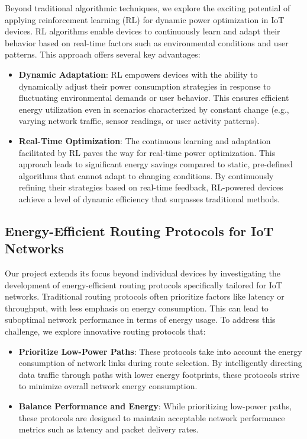\documentclass[11pt,a4paper]{article}
\begin{document}
Beyond traditional algorithmic techniques, we explore the exciting potential of applying reinforcement learning (RL) for dynamic power optimization in IoT devices. RL algorithms enable devices to continuously learn and adapt their behavior based on real-time factors such as environmental conditions and user patterns. This approach offers several key advantages:
\begin{itemize}
    \item \textbf{Dynamic Adaptation}: RL empowers devices with the ability to dynamically adjust their power consumption strategies in response to fluctuating environmental demands or user behavior. This ensures efficient energy utilization even in scenarios characterized by constant change (e.g., varying network traffic, sensor readings, or user activity patterns).

    \item \textbf{Real-Time Optimization}: The continuous learning and adaptation facilitated by RL paves the way for real-time power optimization. This approach leads to significant energy savings compared to static, pre-defined algorithms that cannot adapt to changing conditions. By continuously refining their strategies based on real-time feedback, RL-powered devices achieve a level of dynamic efficiency that surpasses traditional methods.
\end{itemize}

\subsection{Energy-Efficient Routing Protocols for IoT Networks}

Our project extends its focus beyond individual devices by investigating the development of energy-efficient routing protocols specifically tailored for IoT networks. Traditional routing protocols often prioritize factors like latency or throughput, with less emphasis on energy consumption. This can lead to suboptimal network performance in terms of energy usage.  To address this challenge, we explore innovative routing protocols that:
\begin{itemize}
    \item \textbf{Prioritize Low-Power Paths}: These protocols take into account the energy consumption of network links during route selection. By intelligently directing data traffic through paths with lower energy footprints, these protocols strive to minimize overall network energy consumption.
    \item \textbf{Balance Performance and Energy}: While prioritizing low-power paths, these protocols are designed to maintain acceptable network performance metrics such as latency and packet delivery rates.
\end{itemize}
\end{document}
